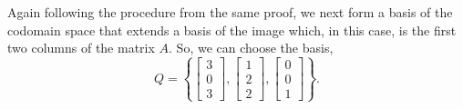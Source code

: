 \documentclass[MathsNotesBase.tex]{subfiles}
\begin{document}
{\begin{exe}
{			Again following the procedure from the same proof, we next form a basis of the codomain space that extends a basis of the image which, in this case, is the first two columns of the matrix $A$. So, we can choose the basis,
			\[ Q = \left\{ \begin{bmatrix}3\\0\\3\end{bmatrix}, \begin{bmatrix}1\\2\\2\end{bmatrix}, \begin{bmatrix}0\\0\\1\end{bmatrix} \right\}. \]
			
}
\end{exe}}
\end{document}
